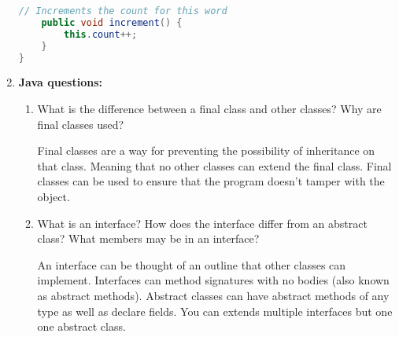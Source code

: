 \documentclass[letterpaper, 11pt]{article}
\begin{document}
\begin{enumerate}[leftmargin=*]
\begin{tcolorbox}[breakable, title=\texttt{WordUsage.java}]
\begin{lstlisting}[language=Java]
    // Increments the count for this word
    public void increment() {
        this.count++;
    }
}
\end{lstlisting}
\end{tcolorbox}

    \item \textbf{Java questions:}
    \begin{enumerate}
        \item What is the difference between a final class and other classes? Why are final classes used?

        Final classes are a way for preventing the possibility of inheritance on that class. Meaning that no other classes can extend the final class. Final classes can be used to ensure that the program doesn't tamper with the object.
        
        \item What is an interface? How does the interface differ from an abstract class? What members may be in an interface?

        An interface can be thought of an outline that other classes can implement. Interfaces can method signatures with no bodies (also known as abstract methods). Abstract classes can have abstract methods of any type as well as declare fields. You can extends multiple interfaces but one one abstract class.
    \end{enumerate}
\end{enumerate}
\end{document}
